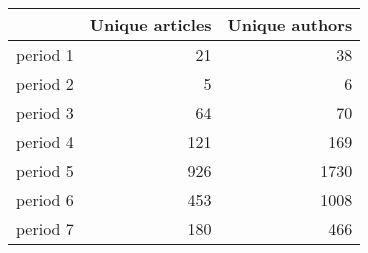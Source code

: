 \begin{tabular}{lrr}
\toprule
{} &  Unique articles &  Unique authors \\
\midrule
period 1 &               21 &              38 \\
period 2 &                5 &               6 \\
period 3 &               64 &              70 \\
period 4 &              121 &             169 \\
period 5 &              926 &            1730 \\
period 6 &              453 &            1008 \\
period 7 &              180 &             466 \\
\bottomrule
\end{tabular}
